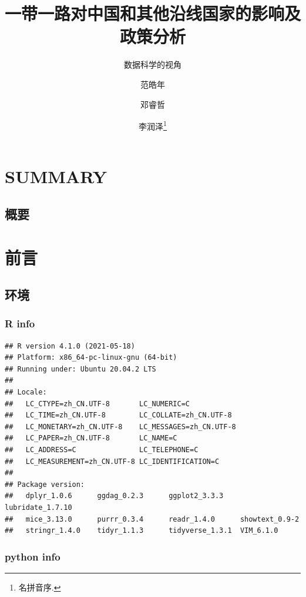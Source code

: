 \documentclass[]{ctexart}
\title{一带一路对中国和其他沿线国家的影响及政策分析}
\subtitle{数据科学的视角}
\author{范皓年 \and 邓睿哲 \and 李润泽\footnote{名拼音序.}}
\date{}
\begin{document}
\maketitle

{
\setcounter{tocdepth}{2}
\tableofcontents
}
\hypertarget{summary}{%
\section{SUMMARY}\label{summary}}

\hypertarget{ux6982ux8981}{%
\subsection{概要}\label{ux6982ux8981}}

\hypertarget{ux524dux8a00}{%
\section{前言}\label{ux524dux8a00}}

\hypertarget{ux73afux5883}{%
\subsection{环境}\label{ux73afux5883}}

\hypertarget{r-info}{%
\subsubsection{R info}\label{r-info}}

\begin{verbatim}
## R version 4.1.0 (2021-05-18)
## Platform: x86_64-pc-linux-gnu (64-bit)
## Running under: Ubuntu 20.04.2 LTS
## 
## Locale:
##   LC_CTYPE=zh_CN.UTF-8       LC_NUMERIC=C              
##   LC_TIME=zh_CN.UTF-8        LC_COLLATE=zh_CN.UTF-8    
##   LC_MONETARY=zh_CN.UTF-8    LC_MESSAGES=zh_CN.UTF-8   
##   LC_PAPER=zh_CN.UTF-8       LC_NAME=C                 
##   LC_ADDRESS=C               LC_TELEPHONE=C            
##   LC_MEASUREMENT=zh_CN.UTF-8 LC_IDENTIFICATION=C       
## 
## Package version:
##   dplyr_1.0.6      ggdag_0.2.3      ggplot2_3.3.3    lubridate_1.7.10
##   mice_3.13.0      purrr_0.3.4      readr_1.4.0      showtext_0.9-2  
##   stringr_1.4.0    tidyr_1.1.3      tidyverse_1.3.1  VIM_6.1.0
\end{verbatim}

\hypertarget{python-info}{%
\subsubsection{python info}\label{python-info}}
\end{document}
